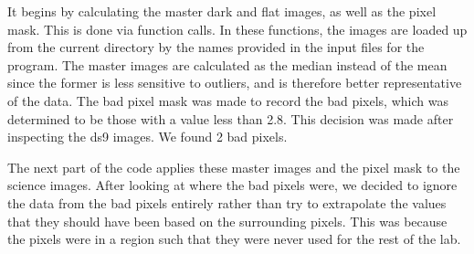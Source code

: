 \documentclass{aastex}
\begin{document}
It begins by calculating the master dark and flat images, as well as the pixel mask. This is done via function calls. In these functions, the images are loaded up from the current directory by the names provided in the input files for the program. The master images are calculated as the median instead of the mean since the former is less sensitive to outliers, and is therefore better representative of the data. The bad pixel mask was made to record the bad pixels, which was determined to be those with a value less than 2.8. This decision was made after inspecting the ds9 images. We found 2 bad pixels.

The next part of the code applies these master images and the pixel mask to the science images. After looking at where the bad pixels were, we decided to ignore the data from the bad pixels entirely rather than try to extrapolate the values that they should have been based on the surrounding pixels. This was because the pixels were in a region such that they were never used for the rest of the lab.
\end{document}
